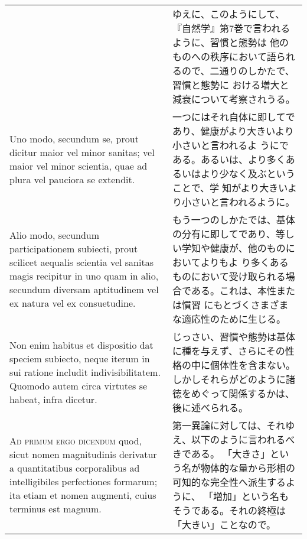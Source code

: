 \documentclass[10pt]{jsarticle} %
\begin{document}
\begin{longtable}{p{21em}p{21em}}
&

ゆえに、このようにして、『自然学』第7巻で言われるように、習慣と態勢は
他のものへの秩序において語られるので、二通りのしかたで、習慣と態勢に
おける増大と減衰について考察されうる。


\\


Uno modo, secundum se, prout dicitur maior vel minor
sanitas; vel maior vel minor scientia, quae ad plura vel pauciora se
extendit. 


&

一つにはそれ自体に即してであり、健康がより大きいより小さいと言われるよ
 うにである。あるいは、より多くあるいはより少なく及ぶということで、学
 知がより大きいより小さいと言われるように。

\\


Alio modo, secundum participationem subiecti, prout scilicet
aequalis scientia vel sanitas magis recipitur in uno quam in alio,
secundum diversam aptitudinem vel ex natura vel ex consuetudine. 


&

もう一つのしかたでは、基体の分有に即してであり、等しい学知や健康が、他のものにおいてよりもよ
 り多くあるものにおいて受け取られる場合である。これは、本性または慣習
 にもとづくさまざまな適応性のために生じる。

\\


Non
enim habitus et dispositio dat speciem subiecto, neque iterum in sui
ratione includit indivisibilitatem. Quomodo autem circa virtutes se
habeat, infra dicetur.

&

じっさい、習慣や態勢は基体に種を与えず、さらにその性格の中に個体性を含まない。
しかしそれらがどのように諸徳をめぐって関係するかは、後に述べられる。

\\


{\scshape Ad primum ergo dicendum} quod, sicut nomen magnitudinis derivatur a
quantitatibus corporalibus ad intelligibiles perfectiones formarum;
ita etiam et nomen augmenti, cuius terminus est magnum.

&

第一異論に対しては、それゆえ、以下のように言われるべきである。
「大きさ」という名が物体的な量から形相の可知的な完全性へ派生するように、
 「増加」という名もそうである。それの終極は「大きい」ことなので。

\\



\end{longtable}
\end{document}
